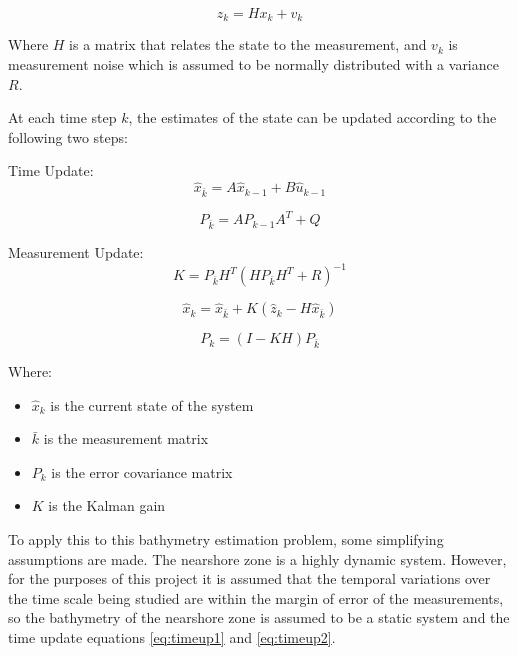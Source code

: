 \begin{equation}
    z_k = Hx_k + v_k
\end{equation}

Where $H$ is a matrix that relates the state to the measurement, and  $v_k$ is measurement noise which is assumed to be normally distributed with a variance $R$.

At each time step $k$, the estimates of the state can be updated according to the following two steps:

Time Update:
\begin{equation}\label{eq:timeup1}
    \hat{x}_{\bar{k}} = A\hat{x}_{k-1} + B\hat{u}_{k-1}
\end{equation}

\begin{equation}\label{eq:timeup2}
    P_{\bar{k}} = A P_{k-1} A^T + Q
\end{equation}

Measurement Update:
\begin{equation}\label{eq:kalmangain}
    K = P_{\bar{k}} H^T(H P_{\bar{k}} H^T + R) ^{-1}
\end{equation}

\begin{equation}\label{eq:new_state_measurement}
    \hat{x}_k = \hat{x}_{\bar{k}} + K(\hat{z}_k - H \hat{x}_{\bar{k}})
\end{equation}

\begin{equation}\label{eq:new_uncertainty}
    P_k = (I - KH)P_{\bar{k}}
\end{equation}

Where:
\begin{itemize}
    \item $\hat{x}_k$ is the current state of the system
    \item $\bar{k}$ is the measurement matrix
    \item $P_k$ is the error covariance matrix
    \item $K$ is the Kalman gain
\end{itemize}

To apply this to this bathymetry estimation problem,  some simplifying assumptions are made. The nearshore zone is a highly dynamic system. However, for the purposes of this project it is assumed that the temporal variations over the time scale being studied are within the margin of error of the measurements, so the bathymetry of the nearshore zone is assumed to be a static system and the time update equations \ref{eq:timeup1} and \ref{eq:timeup2}. 

